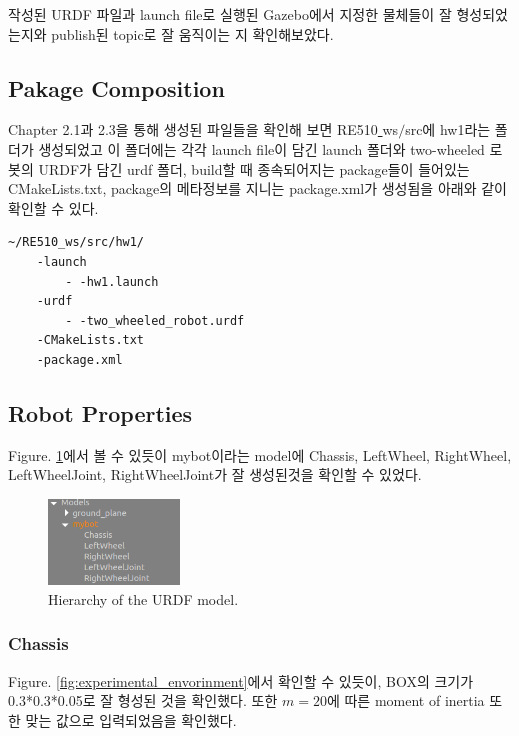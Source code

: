\documentclass{article}
\begin{document}
작성된 URDF 파일과 launch file로 실행된 Gazebo에서 지정한 물체들이 잘 형성되었는지와 publish된 topic로 잘 움직이는 지 확인해보았다.

\subsection{Pakage Composition}

Chapter 2.1과 2.3을 통해 생성된 파일들을 확인해 보면 RE510\underline{ }ws$/$src에 hw1라는 폴더가 생성되었고 이 폴더에는 각각 launch file이 담긴 launch 폴더와 two-wheeled 로봇의 URDF가 담긴 urdf 폴더, build할 때 종속되어지는 package들이 들어있는 CMakeLists.txt, package의 메타정보를 지니는 package.xml가 생성됨을 아래와 같이 확인할 수 있다.

\begin{lstlisting}
~/RE510_ws/src/hw1/
    -launch
        - -hw1.launch
    -urdf
        - -two_wheeled_robot.urdf
    -CMakeLists.txt
    -package.xml
\end{lstlisting}

\subsection{Robot Properties}

 Figure. \ref{fig:architecture}에서 볼 수 있듯이 mybot이라는 model에 Chassis, LeftWheel, RightWheel, LeftWheelJoint, RightWheelJoint가 잘 생성된것을 확인할 수 있었다.

\begin{figure}[h]
	\centering
	\includegraphics[width=3.5cm]{materials/architecture1}
	\caption{Hierarchy of the URDF model.}
	\label{fig:architecture} 	
\end{figure}

\subsubsection{Chassis}

Figure. \ref{fig:experimental_envorinment}에서 확인할 수 있듯이, BOX의 크기가 0.3*0.3*0.05로 잘 형성된 것을 확인했다. 또한 $m=20$에 따른 moment of inertia 또한 맞는 값으로 입력되었음을 확인했다.
\end{document}
